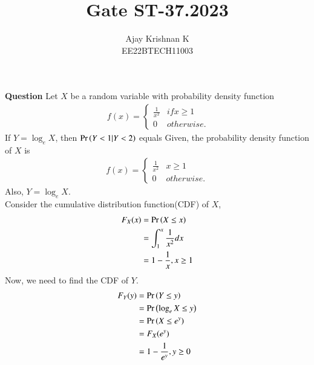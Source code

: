 \documentclass[journal,12pt, twocolumn]{IEEEtran}
\begin{document}


\vspace{3cm}
\author{Ajay Krishnan K\\EE22BTECH11003}

\title{Gate ST-37.2023}
\maketitle

\textbf{Question} 
Let $X$ be a random variable with probability density function
          \begin{align}\
              f(x) = \begin{cases}
                         \frac{1}{x^2} & if x \geq 1 \\
                         0             & otherwise.
                     \end{cases}
          \end{align}
          If $Y = \log_e X$, then $\Pr\left(Y<1 | Y<2 \right)$ equals
          \solution
          \fi 
              Given, the probability density function of $X$ is
          \begin{align}
              f(x) = \begin{cases}
                         \frac{1}{x^2} & x \geq 1 \\
                         0             & otherwise.
                     \end{cases}
          \end{align}
          Also, $Y = \log_e X$.\\
          Consider the cumulative distribution function(CDF) of $X$,
          \begin{align}
              F_X(x) & = \Pr\left(X \leq x\right)                 \\
                     & = \int_{1}^{x} \frac{1}{x^2} dx \\
                     & = 1 - \frac{1}{x} , x \geq 1
          \end{align}
          Now, we need to find the CDF of $Y$.
          \begin{align}
              F_Y(y) & = \Pr\left(Y \leq y\right)                \\
                     & = \Pr\left(\log_e X \leq y\right)         \\
                     & = \Pr\left(X \leq e^y\right)              \\
                     & = F_X(e^y)                     \\
                     & = 1 - \frac{1}{e^y} , y \geq 0
          \end{align}
\end{document}
